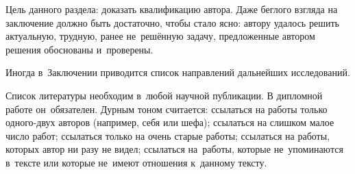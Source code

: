 \documentclass[12pt,fleqn]{article}
\begin{document}
Цель данного раздела: доказать квалификацию автора. 
Даже беглого взгляда на заключение должно быть достаточно, чтобы стало ясно: 
автору удалось решить актуальную, трудную, ранее не~решённую задачу, 
предложенные автором решения обоснованы и~проверены.

Иногда в~Заключении приводится список направлений дальнейших исследований.

\newpage
Список литературы необходим в~любой научной публикации. 
В дипломной работе он~обязателен. 
Дурным тоном считается:
ссылаться на работы только одного-двух авторов (например, себя или шефа);
ссылаться на слишком малое число работ;
ссылаться только на очень старые работы;
ссылаться на работы, которых автор ни разу не видел;
ссылаться на~работы, которые не~упоминаются в~тексте
или которые не~имеют отношения к~данному тексту.
\end{document}
